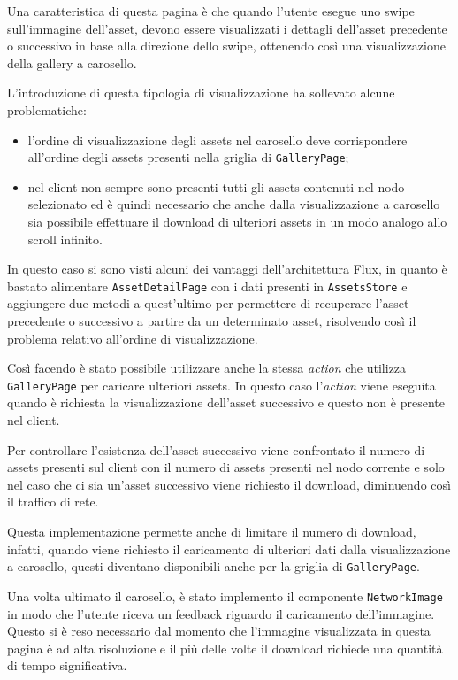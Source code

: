 Una caratteristica di questa pagina è che quando l'utente esegue uno swipe sull'immagine dell'asset, devono essere visualizzati i dettagli dell'asset precedente o successivo in base alla direzione dello swipe, ottenendo così una visualizzazione della gallery a carosello.

L'introduzione di questa tipologia di visualizzazione ha sollevato alcune problematiche:
\begin{itemize}
\item l'ordine di visualizzazione degli assets nel carosello deve corrispondere all'ordine degli assets presenti nella griglia di \texttt{GalleryPage};
\item nel client non sempre sono presenti tutti gli assets contenuti nel nodo selezionato ed è quindi necessario che anche dalla visualizzazione a carosello sia possibile effettuare il download di ulteriori assets in un modo analogo allo scroll infinito.
\end{itemize}

In questo caso si sono visti alcuni dei vantaggi dell'architettura Flux, in quanto è bastato alimentare \texttt{AssetDetailPage} con i dati presenti in \texttt{AssetsStore} e aggiungere due metodi a quest'ultimo per permettere di recuperare l'asset precedente o successivo a partire da un determinato asset, risolvendo così il problema relativo all'ordine di visualizzazione.

Così facendo è stato possibile utilizzare anche la stessa \textit{action} che utilizza \texttt{GalleryPage} per caricare ulteriori assets.
In questo caso l'\textit{action} viene eseguita quando è richiesta la visualizzazione dell'asset successivo e questo non è presente nel client.

Per controllare l'esistenza dell'asset successivo viene confrontato il numero di assets presenti sul client con il numero di assets presenti nel nodo corrente e solo nel caso che ci sia un'asset successivo viene richiesto il download, diminuendo così il traffico di rete.

Questa implementazione permette anche di limitare il numero di download, infatti, quando viene richiesto il caricamento di ulteriori dati dalla visualizzazione a carosello, questi diventano disponibili anche per la griglia di \texttt{GalleryPage}.

Una volta ultimato il carosello, è stato implemento il componente \texttt{NetworkImage} in modo che l'utente riceva un feedback riguardo il caricamento dell'immagine.
Questo si è reso necessario dal momento che l'immagine visualizzata in questa pagina è ad alta risoluzione e il più delle volte il download richiede una quantità di tempo significativa.

